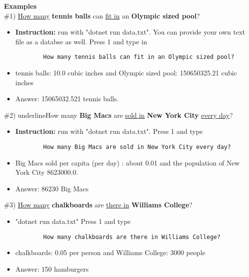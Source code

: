 \documentclass{article}
\begin{document}
\vspace{ 30pt}

{\large{\textbf{Examples }}}  \\

\#1) \underline{How many}  \textbf{tennis balls} can \underline{fit in} an \textbf{Olympic sized pool}? 
\begin{itemize}
    \item \textbf{Instruction:} run with "dotnet run data.txt". You can provide your own text file as a databse as well. Press 1 and type in 
    \begin{verbatim}
        How many tennis balls can fit in an Olympic sized pool?
    \end{verbatim}
    \item tennis balls: 10.0 cubic inches and Olympic sized pool: 150650325.21 cubic inches
    \item Answer: 15065032.521 tennis balls.
\end{itemize}

\newpage
\#2) underline{How many} \textbf{Big Macs} are \underline{sold in} \textbf{New York City} \underline{every day}?
\begin{itemize}
    \item \textbf{Instruction:} run with "dotnet run data.txt". Press 1 and type 
    \begin{verbatim}
        How many Big Macs are sold in New York City every day?
    \end{verbatim}
    \item Big Macs sold per capita (per day) : about 0.01 and the population of New York City 8623000.0. 
    \item Answer: 86230 Big Macs
\end{itemize}

\#3) \underline{How many} \textbf{chalkboards} are \underline{there in} \textbf{Williams College}?
\begin{itemize}
    \item "dotnet run data.txt" Press 1 and type 
    \begin{verbatim}
        How many chalkboards are there in Williams College?
    \end{verbatim}
    \item chalkboards: 0.05 per person and Williams College: 3000 people
    \item Answer: 150 hamburgers
\end{itemize}

\vspace{30pt}
             
\end{document}
